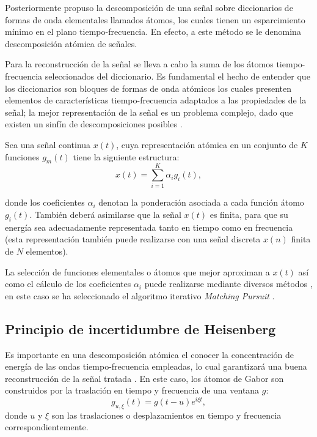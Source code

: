Posteriormente \cite{Gabor1946} propuso la descomposición de una señal sobre diccionarios de formas de onda elementales llamados átomos, los cuales tienen un esparcimiento mínimo en el plano tiempo-frecuencia. En efecto, a este método se le denomina descomposición atómica de señales. 

Para la reconstrucción de la señal se lleva a cabo la suma de los átomos tiempo-frecuencia seleccionados del diccionario. Es fundamental el hecho de entender que los diccionarios son bloques de formas de onda atómicos los cuales presenten elementos de características tiempo-frecuencia adaptados a las propiedades de la señal; la mejor representación de la señal es un problema complejo, dado que existen un sinfín de descomposiciones posibles \cite[]{Gribonval2007}. 

Sea una señal continua $x(t)$, cuya representación atómica en un conjunto de $K$ funciones $g_{m}(t)$ tiene la siguiente estructura:
\begin{equation}\label{atomicDecomp}
	x(t) = \sum_{i=1}^{K}\alpha_{i}g_{i}(t),
\end{equation}

donde los coeficientes $\alpha_{i}$ denotan la ponderación asociada a cada función átomo $g_{i}(t)$. También deberá asimilarse que la señal $x(t)$ es finita, para que su energía sea adecuadamente representada tanto en tiempo como en frecuencia (esta representación también puede realizarse con una señal discreta $x(n)$ finita de $N$ elementos). 

La selección de funciones elementales o átomos que mejor aproximan a $x(t)$ así como el cálculo de los coeficientes $\alpha_{i}$ puede realizarse mediante diversos métodos \cite[]{Nieblas2014}, en este caso se ha seleccionado el algoritmo iterativo \emph{Matching Pursuit} \cite[]{Mallat1993}.

\subsection{Principio de incertidumbre de Heisenberg}

Es importante en una descomposición atómica el conocer la concentración de energía de las ondas tiempo-frecuencia empleadas, lo cual garantizará una buena reconstrucción de la señal tratada \cite[]{Mallat1999}. En este caso, los átomos de Gabor son construidos por la traslación en tiempo y frecuencia de una ventana $g$:
\begin{equation}\label{gaborAtom2}
	g_{u,\xi}(t) = g(t-u)e^{i\xi t},
\end{equation}
donde $u$ y $\xi$ son las traslaciones o desplazamientos en tiempo y frecuencia correspondientemente.

